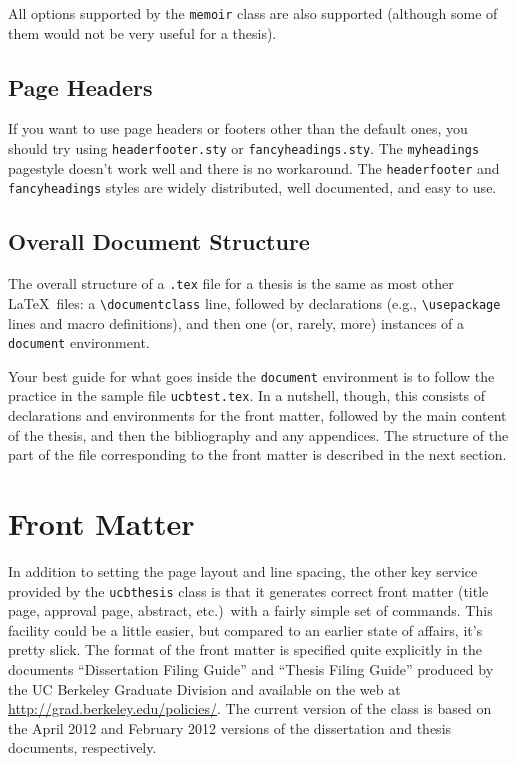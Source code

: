 \documentclass[11pt]{article}
\newcommand*{\pkg}[1]{\texttt{#1}}
\begin{document}
All options supported by the \pkg{memoir} class are also supported
(although some of them would not be very useful for a thesis).

\subsection{Page Headers}

If you want to use page headers or footers other than the default ones,
you should try using \texttt{headerfooter.sty} or \texttt{fancyheadings.sty}.
The \texttt{myheadings} pagestyle doesn't work well and there is no workaround.
The \pkg{headerfooter} and \pkg{fancyheadings} styles are widely distributed,
well documented, and easy to use.

\subsection{Overall Document Structure}

The overall structure of a \verb|.tex| file for a thesis is the same as
most other \LaTeX\ files:  a \verb|\documentclass| line, followed by
declarations (e.g., \verb|\usepackage| lines and macro definitions),
and then one (or, rarely, more) instances of a \verb|document| environment.

Your best guide for what goes inside the \verb|document| environment is
to follow the practice in the sample file \verb|ucbtest.tex|.  In a nutshell,
though, this consists of declarations and environments for the front matter,
followed by the main content of the thesis, and then the bibliography
and any appendices.  The structure of the part of the file
corresponding to the front matter is described in the next section.

\section{Front Matter}

In addition to setting the page layout and line spacing, the other key
service provided by the \pkg{ucbthesis} class is that it generates
correct front matter (title page, approval page, abstract, etc.)\ with
a fairly simple set of commands.  This facility could be a little
easier, but compared to an earlier state of affairs, it's pretty
slick.  The format of the front matter is specified quite explicitly
in the documents ``Dissertation Filing Guide'' and ``Thesis Filing Guide''
produced by the UC Berkeley Graduate Division and available on the web at
\url{http://grad.berkeley.edu/policies/}.
The current version of the class is based on the April 2012 and February 2012
versions of the dissertation and thesis documents, respectively.
\end{document}
